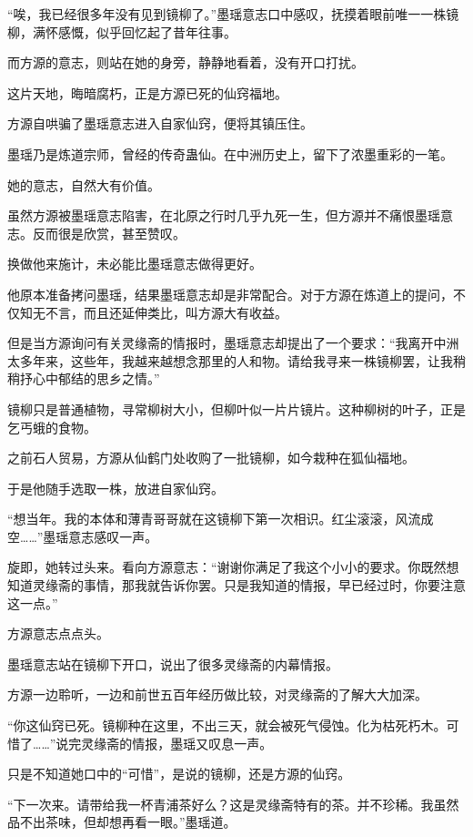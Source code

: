 
\begin{this_body}

“唉，我已经很多年没有见到镜柳了。”墨瑶意志口中感叹，抚摸着眼前唯一一株镜柳，满怀感慨，似乎回忆起了昔年往事。

而方源的意志，则站在她的身旁，静静地看着，没有开口打扰。

这片天地，晦暗腐朽，正是方源已死的仙窍福地。

方源自哄骗了墨瑶意志进入自家仙窍，便将其镇压住。

墨瑶乃是炼道宗师，曾经的传奇蛊仙。在中洲历史上，留下了浓墨重彩的一笔。

她的意志，自然大有价值。

虽然方源被墨瑶意志陷害，在北原之行时几乎九死一生，但方源并不痛恨墨瑶意志。反而很是欣赏，甚至赞叹。

换做他来施计，未必能比墨瑶意志做得更好。

他原本准备拷问墨瑶，结果墨瑶意志却是非常配合。对于方源在炼道上的提问，不仅知无不言，而且还延伸类比，叫方源大有收益。

但是当方源询问有关灵缘斋的情报时，墨瑶意志却提出了一个要求：“我离开中洲太多年来，这些年，我越来越想念那里的人和物。请给我寻来一株镜柳罢，让我稍稍抒心中郁结的思乡之情。”

镜柳只是普通植物，寻常柳树大小，但柳叶似一片片镜片。这种柳树的叶子，正是乞丐蛾的食物。

之前石人贸易，方源从仙鹤门处收购了一批镜柳，如今栽种在狐仙福地。

于是他随手选取一株，放进自家仙窍。

“想当年。我的本体和薄青哥哥就在这镜柳下第一次相识。红尘滚滚，风流成空……”墨瑶意志感叹一声。

旋即，她转过头来。看向方源意志：“谢谢你满足了我这个小小的要求。你既然想知道灵缘斋的事情，那我就告诉你罢。只是我知道的情报，早已经过时，你要注意这一点。”

方源意志点点头。

墨瑶意志站在镜柳下开口，说出了很多灵缘斋的内幕情报。

方源一边聆听，一边和前世五百年经历做比较，对灵缘斋的了解大大加深。

“你这仙窍已死。镜柳种在这里，不出三天，就会被死气侵蚀。化为枯死朽木。可惜了……”说完灵缘斋的情报，墨瑶又叹息一声。

只是不知道她口中的“可惜”，是说的镜柳，还是方源的仙窍。

“下一次来。请带给我一杯青浦茶好么？这是灵缘斋特有的茶。并不珍稀。我虽然品不出茶味，但却想再看一眼。”墨瑶道。


\end{this_body}
